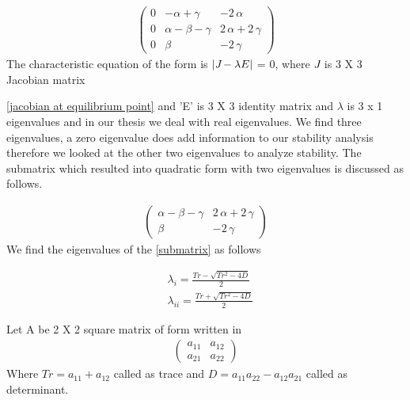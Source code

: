 \documentclass[paper=a4, fontsize=11pt, twoside, BCOR=12mm, parskip=full, listof=totoc]{scrreprt}
\begin{document}
\begin{equation}
\label{jacobian at equilibrium point}
\begin{aligned}
		\left(\begin{array}{rrr}
		0 & -\alpha + \gamma & -2 \, \alpha \\
		0 & \alpha - \beta - \gamma & 2 \, \alpha + 2 \, \gamma \\
		0 & \beta & -2 \, \gamma
		\end{array}\right)
\end{aligned}
\end{equation}
The characteristic equation of the form is \( | \emph{J} - \lambda E | \) = 0, where $\emph{J}$ is 3 X 3 Jacobian matrix {\ref{jacobian at equilibrium point} and 'E' is 3 X 3 identity matrix and $\lambda$ is 3 x 1 eigenvalues and in our thesis we deal with real eigenvalues. We find three eigenvalues, a zero eigenvalue does add information to our stability analysis therefore we looked at the other two eigenvalues to analyze stability. The submatrix which resulted into quadratic form with two eigenvalues is discussed as follows.  

\begin{equation}
\label{submatrix}
\begin{aligned}
	\left(\begin{array}{rr}
		\alpha - \beta - \gamma & 2 \, \alpha + 2 \, \gamma \\
		\beta & -2 \, \gamma
		\end{array}\right)
\end{aligned}
\end{equation}
We find the eigenvalues of the \ref{submatrix} as follows

\begin{equation}
\label{eigenvalue} 
\begin{aligned}
&\lambda_{i} = \frac{Tr - \sqrt{Tr^2-4D}}{2}\\
&\lambda_{ii} = \frac{Tr + \sqrt{Tr^2-4D}}{2}    
\end{aligned}
\end{equation}

Let A be 2 X 2 square matrix of form written in  
\begin{equation}
\label{generalsubmatrix}
\begin{aligned}
	\left(\begin{array}{rr}
		a_{11} & a_{12} \\
		a_{21} & a_{22}
		\end{array}\right)
\end{aligned}
\end{equation}
Where $Tr = a_{11} + a_{12}$ called as trace and $D = a_{11}a_{22} - a_{12}a_{21}$ called as determinant. 
}
\end{document}
